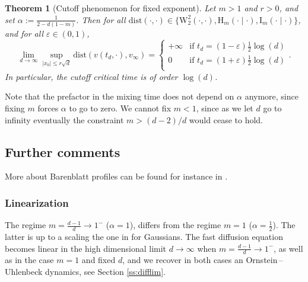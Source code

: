 \documentclass[10pt,reqno]{amsart}
\numberwithin{equation}{section}
\newtheorem{theorem}{Theorem}[section]%
\begin{document}
\begin{theorem}[Cutoff phenomenon for fixed exponent]\label{th:fixed_exp}
 Let $m>1$ and $r > 0$, and set $\alpha:=\frac{1}{2-d(1-m)}$.
 Then for all $\mathrm{dist}(\cdot,\cdot)\in\{\mathrm{W}_2^2(\cdot,\cdot),\mathrm{H}_m(\cdot\mid\cdot),\mathrm{I}_m(\cdot\mid\cdot)\}$, and for all $\varepsilon\in(0,1)$,
  \begin{equation}\label{eq:mfixed:W2}
    \lim_{d\to\infty}
    \sup_{|x_0| \leq r\sqrt{d}}\mathrm{dist}(v(t_d,\cdot),v_\infty)
    =\begin{cases}
    +\infty & \text{if } t_d=(1-\varepsilon)\frac12\log(d)\\
    0 & \text{if } t_d=(1+\varepsilon)\frac12\log(d)\\
    \end{cases}.  
  \end{equation}
  In particular, the cutoff critical time is of order $\log(d)$.
\end{theorem}

Note that the prefactor in the mixing time does not depend on $\alpha$ anymore, since fixing $m$ forces $\alpha$ to go to zero. We cannot fix $m < 1$, since as we let $d$ go to infinity eventually the constraint $m > (d-2)/d$ would cease to hold. 

\subsection{Further comments}

More about Barenblatt profiles can be found for instance in \cite{MR1426127,MR0046217,bonforte:hal-02887010}.

\subsubsection{Linearization}

The regime $m=\frac{d-1}{d}\to1^-$ ($\alpha=1$), differs from the regime $m=1$ ($\alpha=\frac{1}{2}$). The latter is up to a scaling the one in \cite[Th.~1.1]{MR4528974} for Gaussians. The fast diffusion equation becomes linear in the high dimensional limit $d\to\infty$ when $m=\frac{d-1}{d}\to1^-$, as well as in the case $m=1$ and fixed $d$, and we recover in both cases an Ornstein\,--\,Uhlenbeck dynamics, see Section \ref{ss:difflim}.
\end{document}
